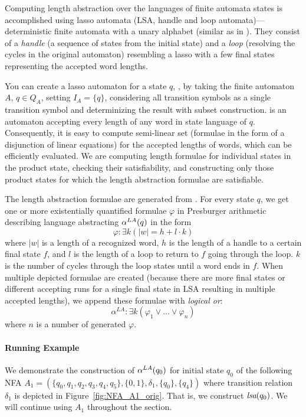 Computing length abstraction over the languages of finite automata states is accomplished using lasso automata (LSA, handle and loop automata)---deterministic finite automata with a unary alphabet (similar as in \cite{10.1007/978-3-319-08867-9_10}). They consist of a \emph{handle} (a sequence of states from the initial state) and a \emph{loop} (resolving the cycles in the original automaton) resembling a lasso with a few final states representing the accepted word lengths.

You can create a lasso automaton for a state $q$, , by taking the finite automaton $A$, $q \in Q_A$, setting $ I_A = \{q\} $, considering all transition symbols as a single transition symbol and determinizing the result with subset construction.  is an automaton accepting every length of any word in state language of $q$. Consequently, it is easy to compute semi-linear set (formulae in the form of a disjunction of linear equations) for the accepted lengths of words, which can be efficiently evaluated. We are computing length formulae for individual states in the product state, checking their satisfiability, and constructing only those product states for which the length abstraction formulae are satisfiable.

The length abstraction formulae are generated from . For every state $q$, we get one or more existentially quantified formulae $\varphi$ in Presburger arithmetic describing language abstracting $\alpha^{LA}(q)$ in the form
\[
    \varphi: \exists k ( |w| = h + l \cdot k )
\]
where $|w|$ is a length of a recognized word, $h$ is the length of a handle to a certain final state $f$, and $l$ is the length of a loop to return to $f$ going through the loop. $k$ is the number of cycles through the loop states until a word ends in $f$. When multiple depicted formulae are created (because there are more final states or different accepting runs for a single final state in LSA resulting in multiple accepted lengths), we append these formulae with \emph{logical or}:
\[
    \alpha^{LA} : \exists k ( \varphi_1 \lor \ldots \lor \varphi_n )
\]
where $n$ is a number of generated $\varphi$.

\paragraph{Running Example}

We demonstrate the construction of $\alpha^{LA}(q_0)$ for initial state $q_0$ of the following NFA $A_1 = (\{q_0, q_1, q_2, q_3, q_4, q_5\}, \{0, 1\}, \delta_1, \{q_0\}, \{q_4\})$ where transition relation $\delta_1$ is depicted in Figure~\ref{fig:NFA_A1_orig}. That is, we construct $\emph{lsa}(q_0)$. We will continue using $A_1$ throughout the section.

